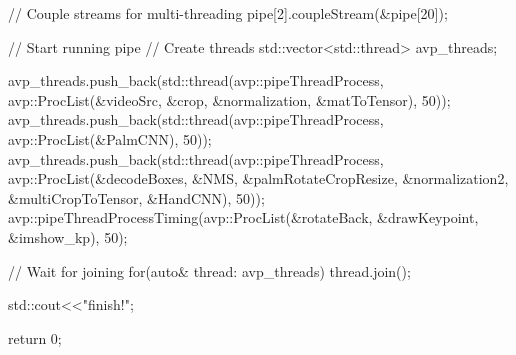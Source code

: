 \begin{codeblock}[language=C++, basicstyle=\ttfamily\footnotesize, numbers=left, caption=Hand Example]
{    // Couple streams for multi-threading
    pipe[2].coupleStream({&pipe[20]});

    // Start running pipe
    // Create threads
    std::vector<std::thread> avp_threads;

    avp_threads.push_back(std::thread(avp::pipeThreadProcess, avp::ProcList({&videoSrc, &crop, &normalization, &matToTensor}), 50));
    avp_threads.push_back(std::thread(avp::pipeThreadProcess, avp::ProcList({&PalmCNN}), 50));
    avp_threads.push_back(std::thread(avp::pipeThreadProcess, avp::ProcList({&decodeBoxes, &NMS, &palmRotateCropResize, &normalization2, &multiCropToTensor, 
        &HandCNN}), 50));
    avp::pipeThreadProcessTiming(avp::ProcList({&rotateBack, &drawKeypoint, &imshow_kp}), 50);

    // Wait for joining
    for(auto& thread: avp_threads)
        thread.join();

    std::cout<<"\nAVP finish!\n";

    return 0;
}
\end{codeblock}